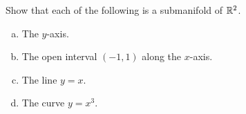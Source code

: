 \begin{exercise}
	Show that each of the following is a submanifold of $\mathbb{R}^2$. 
	\begin{enumerate}[(a)] 
		\item The $y$-axis. 
		\item The open interval $(-1,1)$ along the $x$-axis.
		\item The line $y = x$.  
		\item The curve $y = x^3$. 
	\end{enumerate}
\end{exercise}

